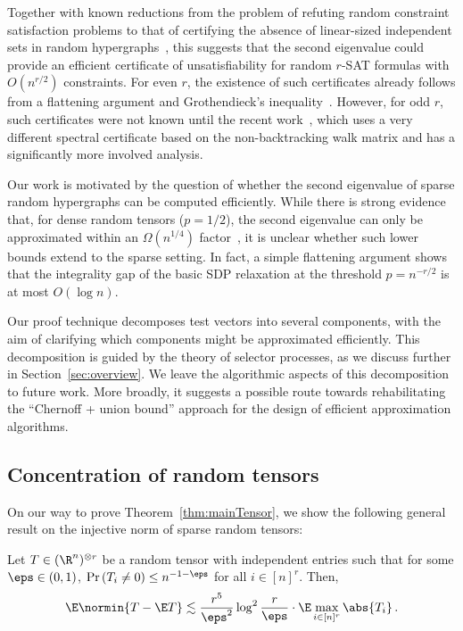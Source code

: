 \documentclass[11pt,a4paper]{article}
\begin{document}
Together with known reductions from the problem of
refuting random constraint satisfaction
problems to that of certifying the absence of linear-sized independent sets in random
hypergraphs~\cite{goerdtKrivilevich}, this suggests that the second eigenvalue could provide an efficient
certificate of unsatisfiability for random $r$-SAT formulas
with $O(n^{r/2})$ constraints.
For even $r$,
the existence of such certificates
already follows from a flattening
argument and Grothendieck's inequality~\cite{randomRefute}.
However, for odd $r$, such certificates were not known until the
recent work~\cite{lucaTom}, which uses a very different spectral certificate based on the
non-backtracking walk matrix and has a significantly more
involved analysis.

Our work is motivated by the question of whether the second eigenvalue of sparse random hypergraphs can be
computed efficiently. 
While there is strong evidence that, for dense random tensors ($p=1/2$), the second eigenvalue can only be approximated
within an $\Omega(n^{1/4})$ factor~\cite{tensorPCASOS,subexpLBPCA}, it is unclear whether such lower bounds
extend to the sparse setting. In fact, a simple flattening argument shows that the integrality gap of
the basic SDP relaxation at the threshold $p = n^{-r/2}$ is at most $O(\log n)$. 

Our proof technique decomposes test vectors into several
components, with the aim of clarifying which components
might be approximated efficiently. This decomposition is guided by the
theory of selector processes, as we discuss further in
Section~\ref{sec:overview}. We leave the algorithmic aspects of this
decomposition to future work. More broadly, it suggests a possible route
towards rehabilitating the ``Chernoff + union bound'' approach for the design of
efficient approximation algorithms.



\subsection{Concentration of random tensors}

On our way to prove Theorem~\ref{thm:mainTensor}, we show the
following general result on the injective norm
of sparse random tensors:

\begin{theorem}\label{thm:tensorVersion}
    Let $T\in (\R^n)^{\otimes r}$ be a random tensor with
    independent entries such that
    for some $\eps\in (0,1)$,
    $\Pr\left(T_i\neq 0\right)\le n^{-1-\eps}$
    for all $i\in [n]^r$. Then,
    \[
        \E \normin{T - \E T} \lesssim \frac {r^5} {\eps^2} \log^2 \frac r \eps \cdot \E  \max_{i\in [n]^r} \abs{T_i}\,.
    \]
\end{theorem}
\end{document}

